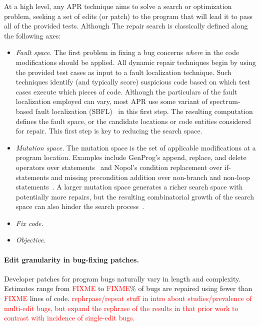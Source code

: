 \documentclass[sigconf, timestamp-false, anonymous=true]{acmart}
\newcommand\todo[1]{\textcolor{red}{#1}}
\begin{document}
At a high level, any APR technique aims to solve a search or optimization
problem, seeking a set of edits (or patch) to the program that will lead it to
pass all of the provided tests.  Although The repair search is classically defined along
the following axes:
\begin{itemize}
\item \emph{Fault space.} The first problem in fixing a bug concerns
  \emph{where} in the code modifications should be applied. All dynamic repair
  techniques begin by using the provided test cases as input to a fault
  localization technique. Such techniques identify (and typically score)
  suspicious code based on which test cases execute which pieces of code.
  Although the particulars of the fault localization employed can vary, most APR
  use some variant of spectrum-based fault localization (SBFL)~\cite{refs} in
  this first step. The resulting computation defines the fault space, or the
  candidate locations or code entities considered for repair. This first step is
  key to reducing the search space.

\item \emph{Mutation space.} The mutation space is the set of applicable 
modifications at a program location. Examples include GenProg's append, 
replace, and delete operators over statements~\cite{genprog-operators} and 
Nopol's condition replacement over if-statements and missing precondition 
addition over non-branch and non-loop statements~\cite{Xuan17}.
A larger mutation space generates 
a richer search space with potentially more repairs, but
the resulting combinatorial growth of the search space can also hinder 
the search process~\cite{long-search-spaces}.

\item \emph{Fix code.}

\item \emph{Objective.} 

\end{itemize}



\paragraph{Edit granularity in bug-fixing patches.}  Developer patches for
program bugs naturally vary in length and complexity.  Estimates range from
\todo{FIXME} to \todo{FIXME}\% of bugs are repaired using fewer than
\todo{FIXME} lines of code.  \todo{rephrpase/repeat stuff in intro about
  studies/prevalence of multi-edit bugs, but expand the rephrase of the results
  in that prior work to contrast with incidence of single-edit bugs.}  
\end{document}
